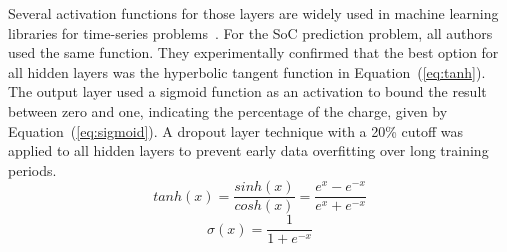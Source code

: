 %
Several activation functions for those layers are widely used in machine learning libraries for time-series problems~\cite{amidi_cs_2018}.
For the SoC prediction problem, all authors used the same function.
They experimentally confirmed that the best option for all hidden layers was the hyperbolic tangent function in \mbox{Equation~(\ref{eq:tanh})}.
The output layer used a sigmoid function as an activation to bound the result between zero and one, indicating the percentage of the charge, given by \mbox{Equation~(\ref{eq:sigmoid})}.
A dropout layer technique with a 20\% cutoff was applied to all hidden layers to prevent early data overfitting over long training periods.
\begin{equation}
    tanh(x) = \frac{sinh(x)}{cosh(x)}=\frac{e^x-e^{-x}}{e^x+e^{-x}}
    \label{eq:tanh}
\end{equation}
\begin{equation}
    \sigma(x) = \frac{1}{1+e^{-x}}
    \label{eq:sigmoid}
\end{equation}
%
%

